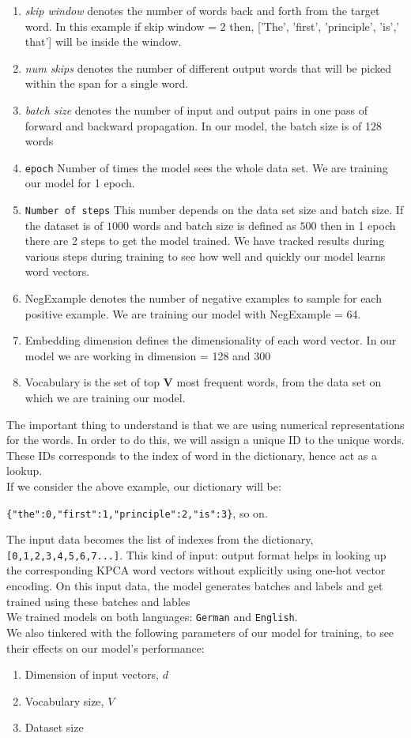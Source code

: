  \begin{enumerate}
 	\item \textit{skip window} denotes the number of words back and forth from the target word. In this example if skip window = 2 then, ['The', 'first', 'principle', 'is',' that'] will be inside the window.
 	\item \textit{num skips} denotes the number of different output words that will be picked within the span for a single word. 
 	\item \textit{batch size} denotes the number of input and output pairs in one pass of forward and backward propagation. In our model, the batch size is of 128 words
 	\item \texttt{epoch} Number of times the model sees the whole data set. We are training our model for 1 epoch.
 	\item \texttt{Number of steps} This number depends on the data set size and batch size. If the dataset is of \texttt{$1000$} words and batch size is defined as \texttt{$500$} then in 1 epoch there are 2 steps to get the model trained. We have tracked results during various steps during training to see how well and quickly our model learns word vectors.
	\item NegExample denotes the number of negative examples to sample for each positive example. We are training our model with NegExample = 64.
	\item Embedding dimension defines the dimensionality of each word vector. In our model we are working in dimension = 128 and 300
	\item Vocabulary is the set of top \textbf{V} most frequent words, from the data set on which we are training our model. 
 \end{enumerate}
  The important thing to understand is that we are using numerical representations for the words. In order to do this, we will assign a unique ID to the unique words. These IDs corresponds to the index of word in the dictionary, hence act as a lookup.\\
 If we consider the above example, our dictionary will be:
 \begin{center}
  \texttt{\{"the":0,"first":1,"principle":2,"is":3\}}, so on.
\end{center}
   The input data becomes the list of indexes from the dictionary,  \texttt{[0,1,2,3,4,5,6,7...]}. This kind of input: output format helps in looking up the corresponding KPCA word vectors without explicitly using one-hot vector encoding. On this input data, the model generates batches and labels and get trained using these batches and lables\\
 We trained models on both languages: \texttt{German} and \texttt{English}.\\
 We also tinkered with the following parameters of our model for training, to see their effects on our model's performance:
 \begin{enumerate}
 	\item Dimension of input vectors, $d$
 	\item Vocabulary size, $V$
 	\item Dataset size
 \end{enumerate}
